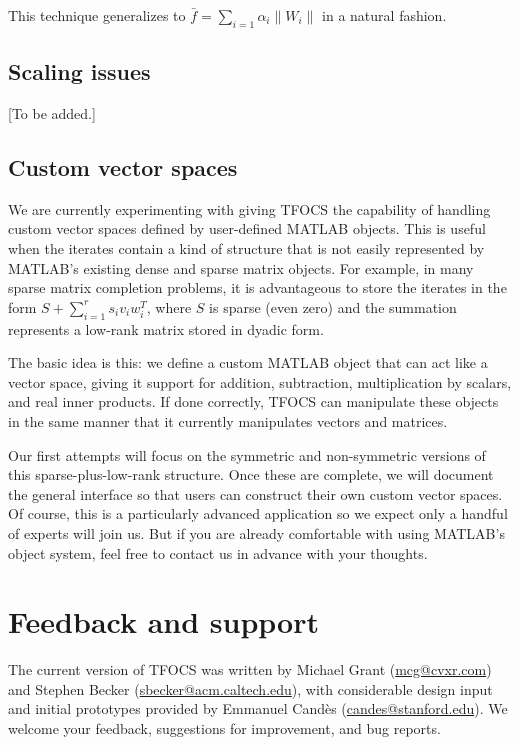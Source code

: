 \documentclass{article}
\begin{document}
This technique generalizes to $\bar{f} = \sum_{i=1} \alpha_i\|W_i\|$
in a natural fashion.

\subsection{Scaling issues}
\label{sec:scaling}

[To be added.]

\subsection{Custom vector spaces}

We are currently experimenting with giving TFOCS the capability
of handling custom vector spaces defined by user-defined MATLAB
objects. This is useful when the iterates contain a kind of
structure that is not easily represented by MATLAB's existing
dense and sparse matrix objects. For example, in many sparse
matrix completion problems, it is
advantageous to store the iterates in the form $S+\sum_{i=1}^r s_i v_iw_i^T$,
where $S$ is sparse (even zero) and the summation represents
a low-rank matrix stored in dyadic form.

The basic idea is this: we define a custom MATLAB object
that can act like a vector space, giving it support for addition,
subtraction, multiplication by scalars, and real inner products.
If done correctly, TFOCS can manipulate these objects in the
same manner that it currently manipulates vectors and matrices.

Our first attempts will focus on the symmetric and non-symmetric
versions of this sparse-plus-low-rank structure. Once these are
complete, we will document the general interface so that users
can construct their own custom vector spaces. Of course, this 
is a particularly advanced application so we expect only a handful
of experts will join us. But if you are already comfortable with
using MATLAB's object system, feel free to contact us in advance
with your thoughts.

\section{Feedback and support}
\label{sec:support}

The current version of TFOCS was written by Michael Grant
(\url{mcg@cvxr.com}) and Stephen Becker (\url{sbecker@acm.caltech.edu}), 
with considerable design input and initial
prototypes provided by Emmanuel Cand\`es (\url{candes@stanford.edu}). 
We welcome your feedback,
suggestions for improvement, and bug reports.
\end{document}
